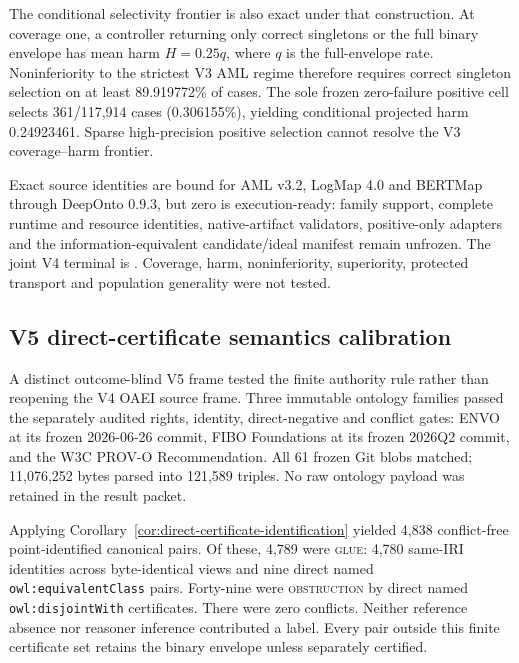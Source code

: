 The conditional selectivity frontier is also exact under that construction.
At coverage one, a controller returning only correct singletons or the full
binary envelope has mean harm $H=0.25q$, where $q$ is the full-envelope rate.
Noninferiority to the strictest V3 AML regime therefore requires correct
singleton selection on at least 89.919772\% of cases. The sole frozen
zero-failure positive cell selects 361/117,914 cases (0.306155\%), yielding
conditional projected harm 0.24923461. Sparse high-precision positive
selection cannot resolve the V3 coverage--harm frontier.

Exact source identities are bound for AML v3.2, LogMap 4.0 and BERTMap through
DeepOnto 0.9.3, but zero is execution-ready: family support, complete runtime
and resource identities, native-artifact validators, positive-only adapters
and the information-equivalent candidate/ideal manifest remain unfrozen. The
joint V4 terminal is
.
Coverage, harm, noninferiority, superiority, protected transport and population
generality were not tested.

\subsection{V5 direct-certificate semantics calibration}

A distinct outcome-blind V5 frame tested the finite authority rule rather than
reopening the V4 OAEI source frame.  Three immutable ontology families passed
the separately audited rights, identity, direct-negative and conflict gates:
ENVO at its frozen 2026-06-26 commit, FIBO Foundations at its frozen 2026Q2
commit, and the W3C PROV-O Recommendation.  All 61 frozen Git blobs matched;
11,076,252 bytes parsed into 121,589 triples. No raw ontology payload was
retained in the result packet.

Applying Corollary~\ref{cor:direct-certificate-identification} yielded 4,838
conflict-free point-identified canonical pairs. Of these, 4,789 were
\textsc{glue}: 4,780 same-IRI identities across byte-identical views and nine
direct named \texttt{owl:equivalentClass} pairs. Forty-nine were
\textsc{obstruction} by direct named \texttt{owl:disjointWith} certificates.
There were zero conflicts. Neither reference absence nor reasoner inference
contributed a label. Every pair outside this finite certificate set retains the
binary envelope unless separately certified.

